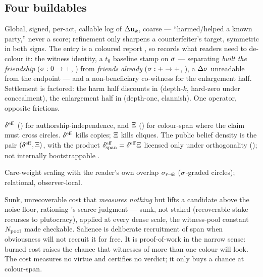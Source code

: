 \documentclass[../main]{subfiles}
\begin{document}
\subsection{Four buildables}
\label{subsec:artifact:buildables}
%
\begin{serieslist}
   Global, signed, per-act, callable log of $\Delta\mathbf{u}\sb{k}$, coarse ---
    ``harmed/helped a known party,'' never a score; refinement only sharpens a counterfeiter's
    target, symmetric in both signs. The entry is a coloured report , so 
    records what readers need to de-colour it: the witness identity, a $t_0$ baseline stamp on
    $\sigma$ --- separating \emph{built the friendship} ($\sigma:0\to+$, ) from
    \emph{friends already} ($\sigma:+\to+$, ), a $\Delta\sigma$ unreadable from
    the endpoint --- and a non-beneficiary co-witness for the enlargement half. Settlement is
    factored: the harm half discounts in  (depth-$k$, hard-zero under concealment),
    the enlargement half in  (depth-one, clannish). One operator, opposite
    frictions.

   $\effdensity$ () for authorship-independence,
    and $\Xi$ () for colour-span where the claim must cross circles.
    $\effdensity$ kills copies; $\Xi$ kills cliques. The public belief density is
    the pair $(\effdensity,\colourspan)$, with the product $\spandensity=\effdensity\colourspan$
    licensed only under orthogonality (); not internally bootstrappable
    .

   Care-weight scaling with the reader's own overlap
    $\sigma\sb{ r\!\to\!k }$ ($\sigma$-graded circles); relational, observer-local.

   Sunk, unrecoverable cost that \emph{measures nothing} but
    lifts a candidate above the noise floor, rationing 's scarce judgment --- sunk, not
    staked (recoverable stake recurses to plutocracy), applied at every dense scale, the
    witness-pool constant $N\sb{\mathrm{pool}}$ made checkable. Salience is deliberate recruitment of
    span when obviousness will not recruit it for free. It is proof-of-work in the narrow
    sense: burned cost raises the chance that witnesses of more than one colour will look.
    The cost measures no virtue and certifies no verdict; it only buys a chance at
    colour-span.
\end{serieslist}
\end{document}
